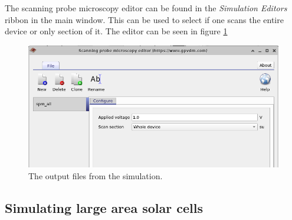 The scanning probe microscopy editor can be found in the \emph{Simulation Editors} ribbon in the main window. This can be used to select if one scans the entire device or only section of it. The editor can be seen in figure \ref{fig:spmeditor} 
\begin{figure}[H]
\centering
\includegraphics[width=\textwidth]{./images/la_7.png}
\caption{The output files from the simulation.}
\label{fig:spmeditor}
\end{figure}

\subsection{Simulating large area solar cells}


